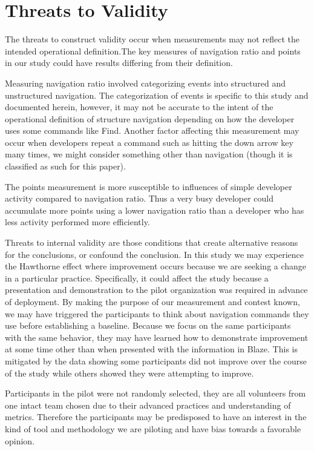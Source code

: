 \documentclass{sig-alternate}
\begin{document}
\section{Threats to Validity}
The threats to construct validity occur when measurements may not reflect the intended operational definition.The key measures of navigation ratio and points in our study could have results differing from their definition.  

Measuring navigation ratio involved categorizing events into structured and unstructured navigation.  The categorization of events is specific to this study and documented herein, however, it may not be accurate to the intent of the operational definition of structure navigation depending on how the developer uses some commands like Find.  Another factor affecting this measurement may occur when developers repeat a command such as hitting the down arrow key many times, we might consider something other than navigation (though it is classified as such for this paper).  

The points measurement is more susceptible to influences of simple developer activity compared to navigation ratio.  Thus a very busy developer could accumulate more points using a lower navigation ratio than a developer who has less activity performed more efficiently.  

Threats to internal validity are those conditions that create alternative reasons for the conclusions, or confound the conclusion.  
In this study we may experience the Hawthorne effect where improvement occurs because we are seeking a change in a particular practice.  Specifically, it could affect the study because a presentation and demonstration to the pilot organization was required in advance of deployment.  By making the purpose of our measurement and contest known,  we may have triggered the participants to think about navigation commands they use before establishing a baseline.  Because we focus on the same participants with the same behavior, they may have learned how to demonstrate improvement at some time other than when presented with the information in Blaze.  This is mitigated by the data showing some participants did not improve over the course of the study while others showed they were attempting to improve.

Participants in the pilot were not randomly selected, they are all volunteers from one intact team chosen due to their advanced practices and understanding of metrics.  Therefore the participants may be predisposed to have an interest in the kind of tool and methodology we are piloting and have bias towards a favorable opinion.  
\end{document}

